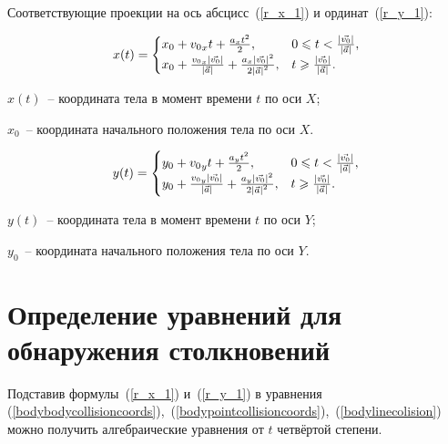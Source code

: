 Соответствующие проекции на ось абсцисс~(\ref{r_x_1}) и ординат~(\ref{r_y_1}):

\begin{equation}\label{r_x_1}
  x(t) =
  \begin{cases}
    x_0 + {v_0}_x t + \frac{a_x t^2}{2},                                                                                               & 0 \leqslant t < \frac{\left|\vec{v_0}\right|}{\left|\vec{a}\right|}, \\
    x_0 + \frac{{v_0}_x \left|\vec{v_0}\right|}{\left|\vec{a}\right|} + \frac{a_x \left|\vec{v_0}\right|^2}{2 \left|\vec{a}\right|^2}, & t \geqslant \frac{\left|\vec{v_0}\right|}{\left|\vec{a}\right|}.
  \end{cases}
\end{equation}

\begin{Underequation}
  \(x(t)\)~-- координата тела в момент времени \(t\) по оси \(X\);

  \(x_0\)~-- координата начального положения тела по оси \(X\).
\end{Underequation}

\begin{equation}\label{r_y_1}
  y(t) =
  \begin{cases}
    y_0 + {v_0}_y t + \frac{a_y t^2}{2},                                                                                               & 0 \leqslant t < \frac{\left|\vec{v_0}\right|}{\left|\vec{a}\right|}, \\
    y_0 + \frac{{v_0}_y \left|\vec{v_0}\right|}{\left|\vec{a}\right|} + \frac{a_y \left|\vec{v_0}\right|^2}{2 \left|\vec{a}\right|^2}, & t \geqslant \frac{\left|\vec{v_0}\right|}{\left|\vec{a}\right|}.
  \end{cases}
\end{equation}

\begin{Underequation}
  \(y(t)\)~-- координата тела в момент времени \(t\) по оси \(Y\);

  \(y_0\)~-- координата начального положения тела по оси \(Y\).
\end{Underequation}


\section{Определение уравнений для обнаружения столкновений}\label{collisiondetectioneqs}

Подставив формулы~(\ref{r_x_1}) и~(\ref{r_y_1}) в уравнения
(\ref{bodybodycollisioncoords}),~(\ref{bodypointcollisioncoords}),~(\ref{bodylinecolision})
можно получить алгебраические уравнения от \(t\) четвёртой степени.

